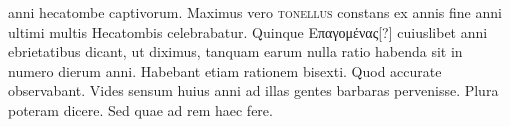 anni hecatombe captivorum.
Maximus vero \textsc{tonellus} constans
ex  annis fine anni ultimi multis Hecatombis celebrabatur.
Quinque \textgreek{Επαγομένας}[?]
 cuiuslibet anni ebrietatibus dicant, ut diximus,
tanquam earum nulla ratio habenda sit in numero dierum anni.
Habebant etiam rationem bisexti.
Quod accurate observabant.
Vides sensum huius anni ad illas gentes barbaras pervenisse.
Plura
poteram dicere.
Sed quae ad rem haec fere.
%
%

























